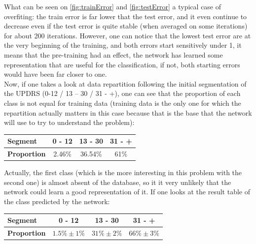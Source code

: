 \documentclass{report}
\begin{document}
\begin{center}
\begin{minipage}{.40\linewidth}
			\label{fig:testError}
		\end{minipage}
		\hspace*{0.6cm}
	\end{center}
	\vspace{1cm}
	
	What can be seen on \ref{fig:trainError} and \ref{fig:testError} a typical case of overfiting: the train error is far lower that the test error, and it even continue to decrease even if the test error is quite stable (when averaged on some iterations) for about 200 iterations. However, one can notice that the lowest test error are at the very beginning of the training, and both errors start sensitively under 1, it means that the pre-training had an effect, the network has learned some representation that are useful for the classification, if not, both starting errors would have been far closer to one.\\
	
	Now, if one takes a look at data repartition following the initial segmentation of the UPDRS (0-12 / 13 – 30 / 31 - +), one can see that the proportion of each class is not equal for training data (training data is the only one for which the repartition actually matters in this case because that is the base that the network will use to try to understand the problem):
	
	\vspace{0.5cm}
	\begin{center}
		\begin{tabular}{|l|c|c|c|}
			\hline \textbf{Segment} & \textbf{0 - 12} & \textbf{13 - 30} & \textbf{31 - +}\\
			\hline \textbf{Proportion} & 2.46\% & 36.54\% & 61\%\\
			\hline
		\end{tabular}
	\end{center}
	\vspace{0.5cm}
	
	Actually, the first class (which is the more interesting in this problem with the second one) is almost absent of the database, so it it very unlikely that the network could learn a good representation of it.
	If one looks at the result table of the class predicted by the network:
	
	\vspace{0.5cm}
	\begin{center}
		\begin{tabular}{|l|c|c|c|}
			\hline \textbf{Segment} & \textbf{0 - 12} & \textbf{13 - 30} & \textbf{31 - +}\\
			\hline \textbf{Proportion} & $1.5\% \pm 1\%$ & $31\% \pm 2\%$ & $66\% \pm 3\%$ \\
			\hline
		\end{tabular}
	\end{center}
	\vspace{0.5cm}
	
\end{document}
